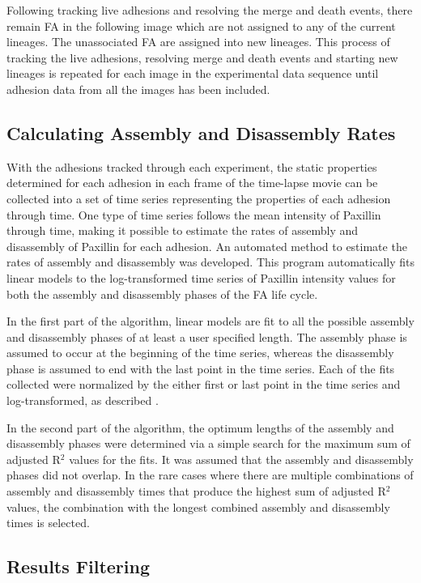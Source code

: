 \documentclass[10pt,draft]{article}
\begin{document}
Following tracking live adhesions and resolving the merge and death events, there remain FA in the following image which are not assigned to any of the current lineages. The unassociated FA are assigned into new lineages. This process of tracking the live adhesions, resolving merge and death events and starting new lineages is repeated for each image in the experimental data sequence until adhesion data from all the images has been included.

\subsection*{Calculating Assembly and Disassembly Rates}

With the adhesions tracked through each experiment, the static properties determined for each adhesion in each frame of the time-lapse movie can be collected into a set of time series representing the properties of each adhesion through time. One type of time series follows the mean intensity of Paxillin through time, making it possible to estimate the rates of assembly and disassembly of Paxillin for each adhesion. An automated method to estimate the rates of assembly and disassembly was developed. This program automatically fits linear models to the log-transformed time series of Paxillin intensity values for both the assembly and disassembly phases of the FA life cycle. 

In the first part of the algorithm, linear models are fit to all the possible assembly and disassembly phases of at least a user specified length. The assembly phase is assumed to occur at the beginning of the time series, whereas the disassembly phase is assumed to end with the last point in the time series. Each of the fits collected were normalized by the either first or last point in the time series and log-transformed, as described \cite{Webb2004}.

In the second part of the algorithm, the optimum lengths of the assembly and disassembly phases were determined via a simple search for the maximum sum of adjusted R$^2$ values for the fits. It was assumed that the assembly and disassembly phases did not overlap. In the rare cases where there are multiple combinations of assembly and disassembly times that produce the highest sum of adjusted R$^2$ values, the combination with the longest combined assembly and disassembly times is selected.

\subsection*{Results Filtering}
\end{document}
